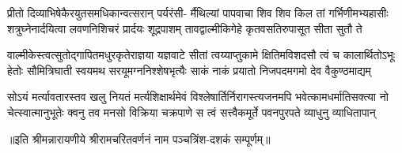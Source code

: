 \fourlineindentedshloka
{प्रीतो दिव्याभिषेकैरयुतसमधिकान्वत्सरान् पर्यरंसी-}
{र्मैथिल्यां पापवाचा शिव शिव किल तां गर्भिणीमभ्यहासीः}
{शत्रुघ्नेनार्दयित्वा लवणनिशिचरं प्रार्दयः शूद्रपाशम्}
{तावद्वाल्मीकिगेहे कृतवसतिरुपासूत सीता सुतौ ते} %

\fourlineindentedshloka
{वाल्मीकेस्त्वत्सुतोद्गापितमधुरकृतेराज्ञया यज्ञवाटे}
{सीतां त्वय्याप्तुकामे क्षितिमविशदसौ त्वं च कालार्थितोऽभूः}
{हेतोः सौमित्रिघाती स्वयमथ सरयूमग्ननिश्शेषभृत्यैः}
{साकं नाकं प्रयातो निजपदमगमो देव वैकुण्ठमाद्यम्} %

\fourlineindentedshloka
{सोऽयं मर्त्यावतारस्तव खलु नियतं मर्त्यशिक्षार्थमेवं}
{विश्लेषार्तिर्निरागस्त्यजनमपि भवेत्कामधर्मातिसक्त्या}
{नो चेत्स्वात्मानुभूतेः क्वनु तव मनसो विक्रिया चक्रपाणे}
{स त्वं सत्त्वैकमूर्ते पवनपुरपते व्याधुनु व्याधितापान्} %

॥इति श्रीमन्नारायणीये श्रीरामचरितवर्णनं नाम पञ्चत्रिंश-दशकं सम्पूर्णम्॥

\closesection